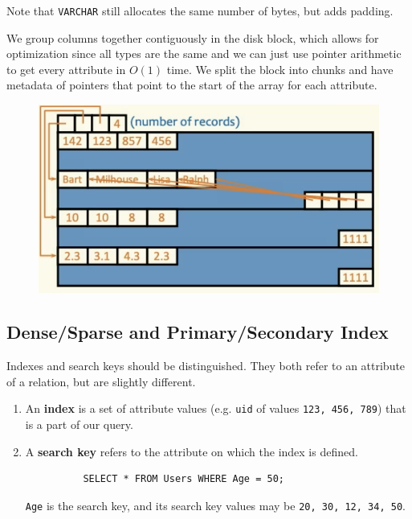 \documentclass{article}
\begin{document}
    Note that \texttt{VARCHAR} still allocates the same number of bytes, but adds padding. 

    \begin{definition}
      We group columns together contiguously in the disk block, which allows for optimization since all types are the same and we can just use pointer arithmetic to get every attribute in $O(1)$ time. We split the block into chunks and have metadata of pointers that point to the start of the array for each attribute. 

      \begin{figure}[H]
        \centering 
        \includegraphics[scale=0.4]{img/column_major.png}
        \caption{} 
        \label{fig:column_major}
      \end{figure}
    \end{definition}

  \subsection{Dense/Sparse and Primary/Secondary Index}

    \begin{definition}
      Indexes and search keys should be distinguished. They both refer to an attribute of a relation, but are slightly different. 
      \begin{enumerate}
        \item An \textbf{index} is a set of attribute values (e.g. \texttt{uid} of values \texttt{123, 456, 789}) that is a part of our query. 

        \item A \textbf{search key} refers to the attribute on which the index is defined. 
        \begin{lstlisting}
          SELECT * FROM Users WHERE Age = 50; 
        \end{lstlisting}
        \texttt{Age} is the search key, and its search key values may be \texttt{20, 30, 12, 34, 50}. 
      \end{enumerate}
    \end{definition}
\end{document}
